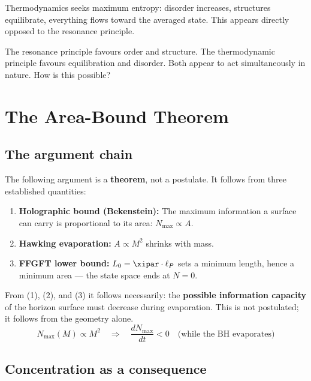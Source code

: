 Thermodynamics seeks maximum entropy: disorder increases, structures equilibrate, everything flows toward the averaged state. This appears directly opposed to the resonance principle.

\begin{wichtig}
The resonance principle favours order and structure. The thermodynamic principle favours equilibration and disorder. Both appear to act simultaneously in nature. How is this possible?
\end{wichtig}

\section{The Area-Bound Theorem}

\subsection{The argument chain}

The following argument is a \textbf{theorem}, not a postulate. It follows from three established quantities:

\begin{enumerate}
  \item \textbf{Holographic bound (Bekenstein):} The maximum information a surface can carry is proportional to its area: $N_\text{max} \propto A$.
  \item \textbf{Hawking evaporation:} $A \propto M^2$ shrinks with mass.
  \item \textbf{FFGFT lower bound:} $L_0 = \xipar \cdot \ell_P$ sets a minimum length, hence a minimum area --- the state space ends at $N = 0$.
\end{enumerate}

\begin{keyresult}
From (1), (2), and (3) it follows necessarily: the \textbf{possible information capacity} of the horizon surface must decrease during evaporation. This is not postulated; it follows from the geometry alone.
\begin{equation}
  N_\text{max}(M) \propto M^2 \quad \Rightarrow \quad \frac{dN_\text{max}}{dt} < 0 \quad \text{(while the BH evaporates)}
\end{equation}
\end{keyresult}

\subsection{Concentration as a consequence}


